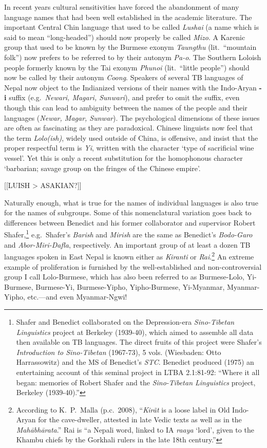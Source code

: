 In recent years cultural sensitivities have forced the abandonment of many
language names that had been well established in the academic literature.  The
important Central Chin language that used to be called \textit{Lushai} (a name which is
said to mean “long-headed”) should now properly be called \textit{Mizo}.
A Karenic group
that used to be known by the Burmese exonym \textit{Taungthu} (lit.\ “mountain folk”) now
prefers to be referred to by their autonym \textit{Pa-o}.  The Southern Loloish people
formerly known by the Tai exonym \textit{Phunoi} (lit.\ “little people”) should now be
called by their autonym \textit{Coong}.  Speakers of several TB languages of Nepal now
object to the Indianized versions of their names with the Indo-Aryan \textbf{-i} suffix
(e.g.\ \textit{Newari, Magari, Sunwari}), and prefer to omit the suffix, even though this
can lead to ambiguity between the names of the people and their languages
(\textit{Newar, Magar, Sunwar}).  The psychological dimensions of these issues are often
as fascinating as they are paradoxical.  Chinese linguists now feel that the
term \textit{Lolo(ish)}, widely used outside of China,
is offensive, and insist that the
proper respectful term is \textit{Yi}, written with the character  ‘type of
sacrificial wine vessel’.  Yet this is only a recent substitution for the
homophonous character  ‘barbarian; savage group on the fringes of the Chinese
empire’.

[[LUISH > ASAKIAN?]]


Naturally enough, what is true for the names of individual languages is also
true for the names of subgroups.  Some of this nomenclatural variation goes back
to differences between Benedict and his former collaborator and supervisor
Robert Shafer,\footnote{Shafer and Benedict collaborated on the Depression-era
\textit{Sino-Tibetan Linguistics} project at Berkeley (1939-40), which aimed to assemble
all data then available on TB languages.  The direct fruits of this project were
Shafer’s \textit{Introduction to Sino-Tibetan} (1967-73), 5 vols. (Wiesbaden: Otto
Harrassowitz) and the MS of Benedict’s \textit{STC}.  Benedict produced (1975) an
entertaining account of this seminal project in LTBA 2.1:81-92: “Where it all
began: memories of Robert Shafer and the \textit{Sino-Tibetan Linguistics} project,
Berkeley (1939-40).”} e.g.\ Shafer’s \textit{Barish} and \textit{Mirish} are the same as Benedict’s
\textit{Bodo-Garo} and \textit{Abor-Miri-Dafla}, respectively.  An important group of at least a
dozen TB languages spoken in East Nepal is known either as \textit{Kiranti} or
\textit{Rai}.\footnote{According to K.~P.~Malla (p.c.~2008), “\textit{Kirãt} is a loose label in Old Indo-Aryan for the cave-dweller, attested in late Vedic texts as well as in the \textit{Mahābhārata}.” Rai is “a Nepali word, linked to IA \textit{raaya} ‘lord’, given to the Khambu chiefs by the Gorkhali rulers in the late 18th century.”}
  An extreme example of proliferation is furnished by the well-established and
non-controversial group I call Lolo-Burmese, which has also been referred to as
Burmese-Lolo, Yi-Burmese, Burmese-Yi, Burmese-Yipho, Yipho-Burmese, Yi-Myanmar,
Myanmar-Yipho, etc.—and even Myanmar-Ngwi!

